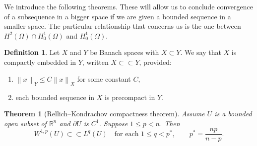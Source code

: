 \documentclass[11pt]{article}
\numberwithin{equation}{section}
\newtheorem{theorem}{Theorem}[section]
\theoremstyle{definition}
\newtheorem{definition}[definition]{Definition}
\theoremstyle{remark}
\newcommand{\R}{\mathbb{R}}
\newcommand{\Honez}{H_0^1(\Omega)}
\newcommand{\norm}[1]{\left\lVert #1 \right\rVert}
\begin{document}
We introduce the following theorems. These will allow us to conclude convergence of a subsequence in a bigger space if we are 
given a bounded sequence in a smaller space. The particular relationship that concerns us is the one between $H^2(\Omega) \cap H_0^1(\Omega)$ and $\Honez$.

\begin{definition}
Let $X$ and $Y$ be Banach spaces with $X\subset Y$. We say that $X$ is compactly embedded in $Y$, written $X\subset\subset Y$, provided:
\begin{enumerate}[label=(\roman*), leftmargin=*, itemsep=0.25em]
  \item $\norm{x}_Y \le C\norm{x}_X$ for some constant $C$,
  \item each bounded sequence in $X$ is precompact in $Y$.
\end{enumerate}
\end{definition}

\begin{theorem}[Rellich--Kondrachov compactness theorem]
Assume $U$ is a bounded open subset of $\R^n$ and $\partial U$ is $C^1$. Suppose $1\le p<n$. Then
\[W^{1,p}(U)\subset\subset L^q(U) \quad\text{for each }1\le q<p^\ast, \qquad p^\ast=\frac{np}{n-p}.\]
\end{theorem}
\end{document}
